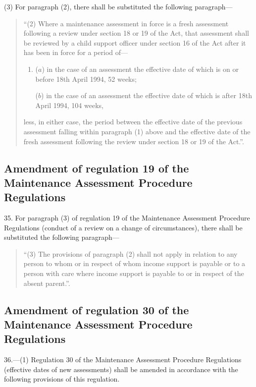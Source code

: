 \documentclass[a4paper]{article}
\begin{document}
(3) For paragraph (2), there shall be substituted the following paragraph—
\begin{quotation}
“(2) Where a maintenance assessment in force is a fresh assessment following a review under section 18 or 19 of the Act, that assessment shall be reviewed by a child support officer under section 16 of the Act after it has been in force for a period of—
\begin{enumerate}\item[]
($a$) in the case of an assessment the effective date of which is on or before 18th April 1994, 52 weeks;

($b$) in the case of an assessment the effective date of which is after 18th April 1994, 104 weeks,
\end{enumerate}
less, in either case, the period between the effective date of the previous assessment falling within paragraph (1) above and the effective date of the fresh assessment following the review under section 18 or 19 of the Act.”.
\end{quotation}

\subsection[35. Amendment of regulation 19 of the Maintenance Assessment Procedure Regulations]{Amendment of regulation 19 of the Maintenance Assessment Procedure Regulations}

35.  For paragraph (3) of regulation 19 of the Maintenance Assessment Procedure Regulations (conduct of a review on a change of circumstances), there shall be substituted the following paragraph—
\begin{quotation}
“(3) The provisions of paragraph (2) shall not apply in relation to any person to whom or in respect of whom income support is payable or to a person with care where income support is payable to or in respect of the absent parent.”.
\end{quotation}

\subsection[36. Amendment of regulation 30 of the Maintenance Assessment Procedure Regulations]{Amendment of regulation 30 of the Maintenance Assessment Procedure Regulations}

36.—(1) Regulation 30 of the Maintenance Assessment Procedure Regulations (effective dates of new assessments) shall be amended in accordance with the following provisions of this regulation.
\end{document}

